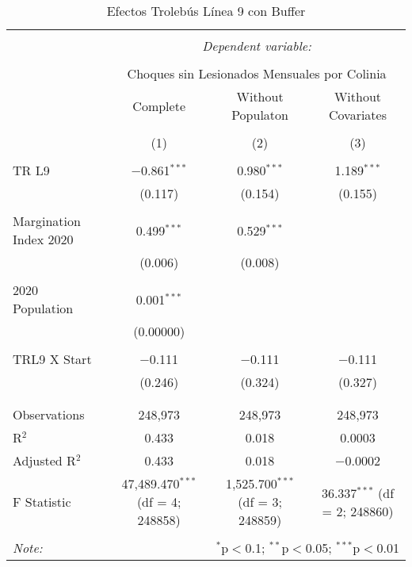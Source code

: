 
\begin{table}[!htbp] \centering 
  \caption{Efectos Trolebús Línea 9 con Buffer} 
  \label{} 
\begin{tabular}{@{\extracolsep{5pt}}lccc} 
\\[-1.8ex]\hline 
\hline \\[-1.8ex] 
 & \multicolumn{3}{c}{\textit{Dependent variable:}} \\ 
\cline{2-4} 
\\[-1.8ex] & \multicolumn{3}{c}{Choques sin Lesionados Mensuales por Colinia} \\ 
 & Complete & Without Populaton & Without Covariates \\ 
\\[-1.8ex] & (1) & (2) & (3)\\ 
\hline \\[-1.8ex] 
 TR L9 & $-$0.861$^{***}$ & 0.980$^{***}$ & 1.189$^{***}$ \\ 
  & (0.117) & (0.154) & (0.155) \\ 
  & & & \\ 
 Margination Index 2020 & 0.499$^{***}$ & 0.529$^{***}$ &  \\ 
  & (0.006) & (0.008) &  \\ 
  & & & \\ 
 2020 Population & 0.001$^{***}$ &  &  \\ 
  & (0.00000) &  &  \\ 
  & & & \\ 
 TRL9 X Start & $-$0.111 & $-$0.111 & $-$0.111 \\ 
  & (0.246) & (0.324) & (0.327) \\ 
  & & & \\ 
\hline \\[-1.8ex] 
Observations & 248,973 & 248,973 & 248,973 \\ 
R$^{2}$ & 0.433 & 0.018 & 0.0003 \\ 
Adjusted R$^{2}$ & 0.433 & 0.018 & $-$0.0002 \\ 
F Statistic & 47,489.470$^{***}$ (df = 4; 248858) & 1,525.700$^{***}$ (df = 3; 248859) & 36.337$^{***}$ (df = 2; 248860) \\ 
\hline 
\hline \\[-1.8ex] 
\textit{Note:}  & \multicolumn{3}{r}{$^{*}$p$<$0.1; $^{**}$p$<$0.05; $^{***}$p$<$0.01} \\ 
\end{tabular} 
\end{table} 
